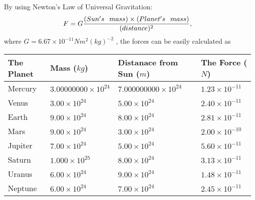 \documentclass[12pt]{article}
\begin{document}
 
 
 
\noindent{}
 
 

By using Newton's Law of Universal Gravitation:
\[
F=G \frac{(Sun's \hspace{0.1in} mass) \times (Planet's \hspace{0.1in} mass)} { (distance)^2},
\]
where
$ G= %
6.67 \times 10^{-11}N m^{2}(kg)^{-2}$ , the forces can be easily calculated as
 
\vspace{0.2in}
 
 
\begin{tabular}{|l|l|l|l|}
\hline
The Planet & Mass ($kg$) & Distanace from Sun ($m$) & The Force ($N$)\\
\hline
Mercury  &
           $ %
3.00000000 \times 10^{24} $   &
             $ %
7.000000000 \times 10^{24} $    & $ %
1.23 \times 10^{-11} $
\\  \hline
Venus    &
           $  %
3.00 \times 10^{24}  $     &
             $ %
5.00 \times 10^{24} $    & $ %
2.40 \times 10^{-11} $
\\  \hline
Earth    &
           $  %
9.00 \times 10^{24}  $     &
             $ %
8.00 \times 10^{24} $    & $ %
2.81 \times 10^{-11} $
\\   \hline
Mars     &
           $  %
9.00 \times 10^{24} $     &
             $ %
3.00 \times 10^{24} $    & $ %
2.00 \times 10^{-10} $
\\   \hline
Jupiter  &
           $  %
7.00 \times 10^{24} $    &
             $ %
5.00 \times 10^{24} $    & $ %
5.60 \times 10^{-11} $
\\  \hline
Saturn   &
           $  %
1.000 \times 10^{25} $    &
             $ %
8.00 \times 10^{24}  $    & $ %
3.13 \times 10^{-11} $
\\  \hline
Uranus   &
           $  %
6.00 \times 10^{24} $    &
             $ %
9.00 \times 10^{24} $    & $ %
1.48 \times 10^{-11} $
\\  \hline
Neptune  &
           $  %
6.00 \times 10^{24} $    &
             $ %
7.00 \times 10^{24} $    & $ %
2.45 \times 10^{-11} $
\\  \hline
 
\end{tabular}
 
 
 
 
\noindent{}
 
\end{document}
